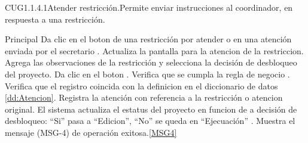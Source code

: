 %  
  

	\begin{UseCase}{CUG1.1.4.1}{Atender restricción.}{Permite enviar instrucciones al coordinador, en respuesta a una restricción.}
	\end{UseCase}
		
      
	\begin{UCtrayectoria}{Principal}
		\UCpaso[\UCactor] Da clic en el boton  de una restricción por atender o en una atención enviada por el secretario .
		\UCpaso Actualiza la pantalla para la atencion de la restriccion.
		\UCpaso [\UCactor] Agrega las observaciones de la restricción y selecciona la decisión de desbloqueo del proyecto.\label{paso:CUG3ingresaDatosTurnar}
		\UCpaso [\UCactor] Da clic en el boton . 
		\UCpaso Verifica que se cumpla la regla de negocio . 
		\UCpaso Verifica que el registro coincida con la definicion en el diccionario de datos \ref{dd:Atencion}. 
		\UCpaso Registra la atención con referencia a la restricción o atencion original.
		\UCpaso El sistema actualiza el estatus del proyecto en funcion de a decisión de desbloqueo: ``Si'' pasa a  ``Edicion'', ``No'' se queda en ``Ejecuación'' .
		\UCpaso Muestra el mensaje (MSG-4) de operación exitosa.\ref{MSG4}
	\end{UCtrayectoria}
		
